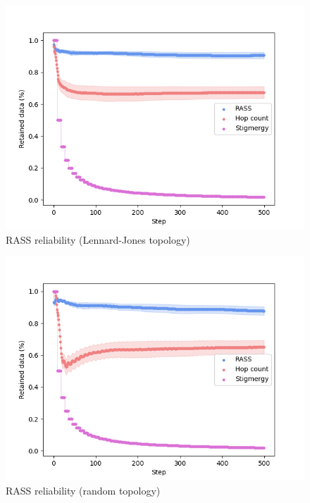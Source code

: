 \begin{figure}
    \includegraphics[width=16cm]{figures/dora_mesh/lennard_reliability.png}
        \caption{RASS reliability (Lennard-Jones topology)}
        \label{results:lennard_100_reliability}
\end{figure}

\begin{figure}
    \centering
    \includegraphics[width=16cm]{figures/dora_mesh/random_reliability.png}
    \caption{RASS reliability (random topology)}
    \label{results:random_100_reliability}
\end{figure}

